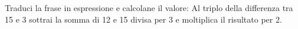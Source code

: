 \item Traduci la frase in espressione e calcolane il valore: Al triplo della differenza tra 15 e 3 sottrai la somma di 12 e 15 divisa per 3 e moltiplica il risultato per 2.